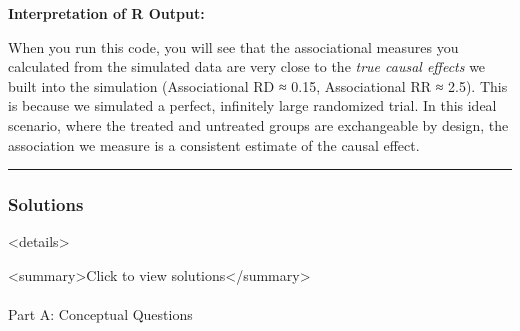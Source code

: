 \documentclass[
  10pt,
  letterpaper,
  DIV=11,
  numbers=noendperiod]{scrartcl}
\makeatletter
\let\oldparagraph\paragraph
\renewcommand{\paragraph}{
    \@ifstar
      \xxxParagraphStar
      \xxxParagraphNoStar
  }
\newcommand{\xxxParagraphStar}[1]{\oldparagraph*{#1}\mbox{}}
\newcommand{\xxxParagraphNoStar}[1]{\oldparagraph{#1}\mbox{}}
\makeatother
\begin{document}
\textbf{Interpretation of R Output:}

When you run this code, you will see that the associational measures you
calculated from the simulated data are very close to the \emph{true
causal effects} we built into the simulation (Associational RD ≈ 0.15,
Associational RR ≈ 2.5). This is because we simulated a perfect,
infinitely large randomized trial. In this ideal scenario, where the
treated and untreated groups are exchangeable by design, the association
we measure is a consistent estimate of the causal effect.

\begin{center}\rule{0.5\linewidth}{0.5pt}\end{center}

\subsubsection{Solutions}\label{solutions}

\textless details\textgreater{}

\textless summary\textgreater Click to view
solutions\textless/summary\textgreater{}

\paragraph{Part A: Conceptual
Questions}\label{part-a-conceptual-questions-1}
\end{document}
